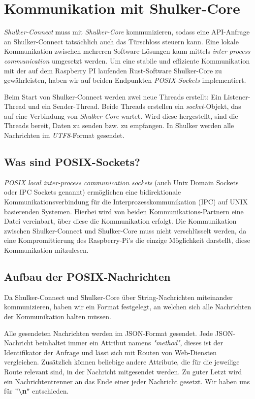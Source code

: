 \lstset{language=json}
\chapter{Kommunikation mit Shulker-Core}
\textit{Shulker-Connect} muss mit \textit{Shulker-Core} kommunizieren, sodass eine API-Anfrage an Shulker-Connect tatsächlich
auch das Türschloss steuern kann.
Eine lokale Kommunikation zwischen mehreren Software-Lösungen kann mittels
\textit{inter process communication} umgesetzt werden. 
Um eine stabile und effiziente Kommunikation mit der auf dem Raspberry PI laufenden Rust-Software Shulker-Core zu 
gewährleisten, haben wir auf beiden Endpunkten \textit{POSIX-Sockets} implementiert.

Beim Start von Shulker-Connect werden zwei neue Threads erstellt: Ein Listener-Thread und ein Sender-Thread.
Beide Threads erstellen ein \textit{socket}-Objekt, das auf eine Verbindung von \textit{Shulker-Core} wartet.
Wird diese hergestellt, sind die Threads bereit, Daten zu senden bzw. zu empfangen.
In Shulker werden alle Nachrichten im \textit{UTF8}-Format gesendet.

\section{Was sind POSIX-Sockets?}
\textit{POSIX local inter-process communication sockets} (auch Unix Domain Sockets oder IPC Sockets genannt) ermöglichen
eine bidirektionale Kommunikationsverbindung für die Interprozesskommunikation (IPC) auf UNIX basierenden Systemen.
Hierbei wird von beiden Kommunikations-Partnern eine Datei vereinbart, über diese die Kommunikation erfolgt. \cite{ipcsockets}
Die Kommunikation zwischen Shulker-Connect und Shulker-Core muss nicht verschlüsselt werden, da eine Kompromittierung des
Raspberry-Pi's die einzige Möglichkeit darstellt, diese Kommunikation mitzulesen. 

\section{Aufbau der POSIX-Nachrichten}
Da Shulker-Connect und Shulker-Core über String-Nachrichten miteinander kommunizieren, haben wir ein
Format festgelegt, an welchen sich alle Nachrichten der Kommunikation halten müssen.


Alle gesendeten Nachrichten werden im JSON-Format gesendet. Jede JSON-Nachricht beinhaltet immer ein Attribut namens
\textit{"method"}, dieses ist der Identifikator der Anfrage und lässt sich mit Routen von Web-Diensten vergleichen.
Zusätzlich können beliebige andere Attribute, die für die jeweilige Route relevant sind, in der Nachricht mitgesendet werden.
Zu guter Letzt wird ein Nachrichtentrenner an das Ende einer jeder Nachricht gesetzt. Wir haben uns für
\textbf{"\textbackslash n"} entschieden.

